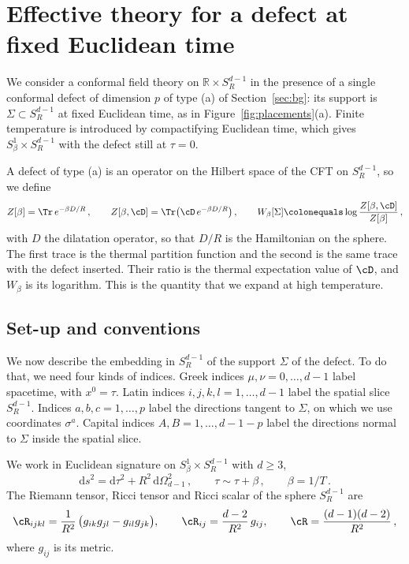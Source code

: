\documentclass[a4paper,11pt]{article}
\newcommand{\dd}{\mathrm{d}}
\begin{document}
\section{Effective theory for a defect at fixed Euclidean time}\label{sec:main}

We consider a conformal field theory on $\mathbb{R}\times S^{d-1}_R$ in the presence of a single conformal defect of dimension $p$ of type (a) of Section~\ref{sec:bg}: its support is $\Sigma\subset S^{d-1}_R$ at fixed Euclidean time, as in Figure~\ref{fig:placements}(a). Finite temperature is introduced by compactifying Euclidean time, which gives $S^1_\beta\times S^{d-1}_R$ with the defect still at $\tau=0$.

A defect of type (a) is an operator on the Hilbert space of the CFT on $S^{d-1}_R$, so we define
\begin{equation}
	Z[\beta]=\Tr\, e^{-\beta D/R}\, ,\qquad
	Z[\beta,\cD]=\Tr\bigl(\cD\, e^{-\beta D/R}\bigr)\, ,\qquad
	W_\beta[\Sigma]\colonequals\log\frac{Z[\beta,\cD]}{Z[\beta]}\, ,
\end{equation}
with $D$ the dilatation operator, so that $D/R$ is the Hamiltonian on the sphere. The first trace is the thermal partition function and the second is the same trace with the defect inserted. Their ratio is the thermal expectation value of $\cD$, and $W_\beta$ is its logarithm. This is the quantity that we expand at high temperature.

\subsection{Set-up and conventions}
We now describe the embedding in $S^{d-1}_R$ of the support $\Sigma$ of the defect. To do that, we need four kinds of indices. Greek indices $\mu,\nu=0,\dots,d-1$ label spacetime, with $x^0=\tau$. Latin indices $i,j,k,l=1,\dots,d-1$ label the spatial slice $S^{d-1}_R$. Indices $a,b,c=1,\dots,p$ label the directions tangent to $\Sigma$, on which we use coordinates $\sigma^a$. Capital indices $A,B=1,\dots,d-1-p$ label the directions normal to $\Sigma$ inside the spatial slice.

We work in Euclidean signature on $S^1_\beta\times S^{d-1}_R$ with $d\ge 3$,
\begin{equation}
	\dd s^2=\dd\tau^2+R^2\,\dd\Omega_{d-1}^2\, ,\qquad \tau\sim\tau+\beta\, ,\qquad \beta=1/T \, .
\end{equation}
The Riemann tensor, Ricci tensor and Ricci scalar of the sphere $S^{d-1}_R$ are
\begin{equation}\label{eq:ambient}
	\cR_{ijkl}=\frac{1}{R^2}\,\bigl(g_{ik}g_{jl}-g_{il}g_{jk}\bigr),\qquad
	\cR_{ij}=\frac{d-2}{R^2}\,g_{ij},\qquad \cR=\frac{(d-1)(d-2)}{R^2}\, ,
\end{equation}
where $g_{ij}$ is its metric. 
\end{document}
